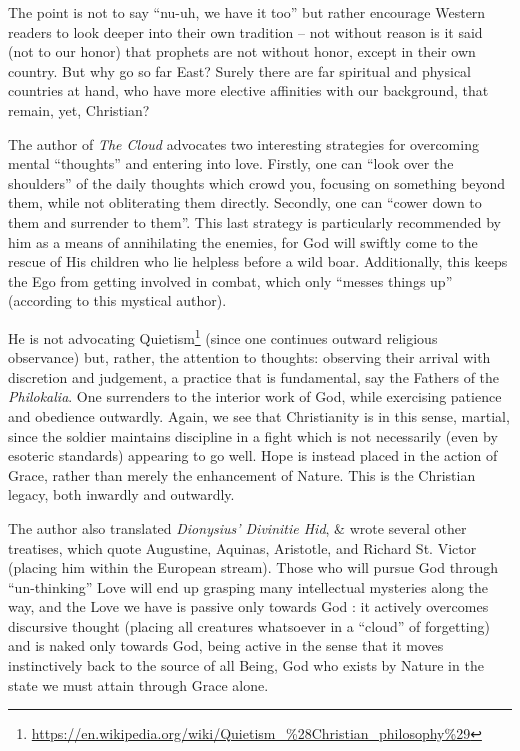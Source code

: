 The point is not to say ``nu-uh, we have it too'' but rather encourage Western readers to look deeper into their own tradition -- not without reason is it said (not to our honor) that prophets are not without honor, except in their own country. But why go so far East? Surely there are far spiritual and physical countries at hand, who have more elective affinities with our background, that remain, yet, Christian?

The author of \emph{The Cloud} advocates two interesting strategies for overcoming mental ``thoughts'' and entering into love. Firstly, one can ``look over the shoulders'' of the daily thoughts which crowd you, focusing on something beyond them, while not obliterating them directly. Secondly, one can ``cower down to them and surrender to them''. This last strategy is particularly recommended by him as a means of annihilating the enemies, for God will swiftly come to the rescue of His children who lie helpless before a wild boar. Additionally, this keeps the Ego from getting involved in combat, which only ``messes things up'' (according to this mystical author).

He is not advocating Quietism\footnote{\url{https://en.wikipedia.org/wiki/Quietism\_\%28Christian\_philosophy\%29}} (since one continues outward religious observance) but, rather, the attention to thoughts: observing their arrival with discretion and judgement, a practice that is fundamental, say the Fathers of the \emph{Philokalia}. One surrenders to the interior work of God, while exercising patience and obedience outwardly. Again, we see that Christianity is in this sense, martial, since the soldier maintains discipline in a fight which is not necessarily (even by esoteric standards) appearing to go well. Hope is instead placed in the action of Grace, rather than merely the enhancement of Nature. This is the Christian legacy, both inwardly and outwardly.

The author also translated \emph{Dionysius' Divinitie Hid}, \& wrote several other treatises, which quote Augustine, Aquinas, Aristotle, and Richard St. Victor (placing him within the European stream). Those who will pursue God through ``un-thinking'' Love will end up grasping many intellectual mysteries along the way, and the Love we have is passive only towards God : it actively overcomes discursive thought (placing all creatures whatsoever in a ``cloud'' of forgetting) and is naked only towards God, being active in the sense that it moves instinctively back to the source of all Being, God who exists by Nature in the state we must attain through Grace alone.

